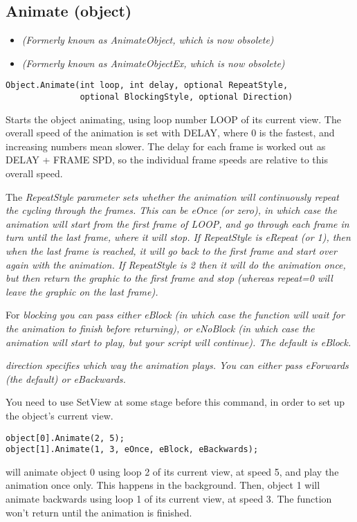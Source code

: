 \subsection{Animate (object)}\label{Object.Animate}%

\begin{itemize}
\item \it{(Formerly known as AnimateObject, which is now obsolete)}
\item \it{(Formerly known as AnimateObjectEx, which is now obsolete)}
\end{itemize}

\begin{verbatim}
Object.Animate(int loop, int delay, optional RepeatStyle,
               optional BlockingStyle, optional Direction)
\end{verbatim}
Starts the object animating, using loop number LOOP of its current view.
The overall speed of the animation is set with DELAY, where 0 is the
fastest, and increasing numbers mean slower. The delay for each frame
is worked out as DELAY + FRAME SPD, so the individual frame speeds are
relative to this overall speed.

The \it{RepeatStyle} parameter sets whether the animation will continuously repeat
the cycling through the frames. This can be \it{eOnce} (or zero), in which case the animation
will start from the first frame of LOOP, and go through each frame in turn until the
last frame, where it will stop. If RepeatStyle is \it{eRepeat} (or 1), then when the last frame
is reached, it will go back to the first frame and start over again with the animation.
If RepeatStyle is 2 then it will do the animation once, but then return
the graphic to the first frame and stop (whereas repeat=0 will leave the
graphic on the last frame).

For \it{blocking} you can pass either eBlock (in which case the function will wait
for the animation to finish before returning), or eNoBlock (in which case the animation
will start to play, but your script will continue). The default is eBlock.

\it{direction} specifies which way the animation plays. You can either pass eForwards (the
default) or eBackwards.

You need to use SetView at some stage before this command, in order to set up the object's
current view.

\begin{verbatim}
object[0].Animate(2, 5);
object[1].Animate(1, 3, eOnce, eBlock, eBackwards);
\end{verbatim}
will animate object 0 using loop 2 of its current view, at speed 5, and play the
animation once only. This happens in the background.
Then, object 1 will animate backwards using loop 1 of its current view, at speed 3. The
function won't return until the animation is finished.

